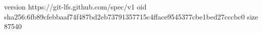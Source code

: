 version https://git-lfs.github.com/spec/v1
oid sha256:6fb89cfebbaaf74f487bd2eb73791357715c4fface9545377cbe1bed27cccbc0
size 87540
